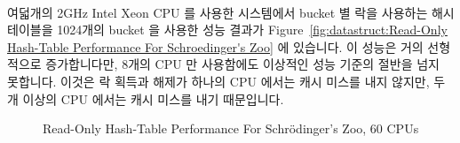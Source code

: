 여덟개의 2GHz
Intel\textsuperscript\textregistered
Xeon\textsuperscript\textregistered
CPU 를 사용한 시스템에서 bucket 별 락을 사용하는 해시 테이블을 1024개의 bucket
을 사용한 성능 결과가
Figure~\ref{fig:datastruct:Read-Only Hash-Table Performance For Schroedinger's
Zoo} 에 있습니다.
이 성능은 거의 선형적으로 증가합니다만, 8개의 CPU 만 사용함에도 이상적인 성능
기준의 절반을 넘지 못합니다.
이것은 락 획득과 해제가 하나의 CPU 에서는 캐시 미스를 내지 않지만, 두개 이상의
CPU 에서는 캐시 미스를 내기 때문입니다.

\begin{figure}[tb]
\centering
{}
\caption{Read-Only Hash-Table Performance For Schr\"odinger's Zoo, 60 CPUs}
\label{fig:datastruct:Read-Only Hash-Table Performance For Schroedinger's Zoo, 60 CPUs}
\end{figure}

